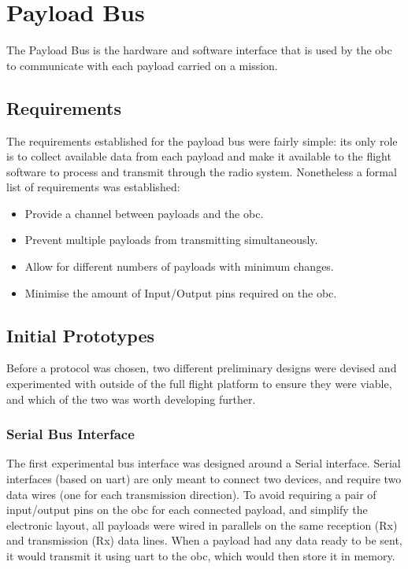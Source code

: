 \section{Payload Bus}
\label{sec:payload-bus}

The Payload Bus is the hardware and software interface that is used by the
\acrfull{obc} to communicate with each payload carried on a mission.

\subsection{Requirements}

The requirements established for the payload bus were fairly simple: its only
role is to collect available data from each payload and make it available to
the flight software to process and transmit through the radio system.
Nonetheless a formal list of requirements was established:

\begin{itemize}
\item Provide a channel between payloads and the \acrshort{obc}.
\item Prevent multiple payloads from transmitting simultaneously.
\item Allow for different numbers of payloads with minimum changes.
\item Minimise the amount of Input/Output pins required on the \acrshort{obc}.
\end{itemize}

\subsection{Initial Prototypes}

Before a protocol was chosen, two different preliminary designs were devised
and experimented with outside of the full flight platform to ensure they were
viable, and which of the two was worth developing further.

\subsubsection{Serial Bus Interface}

The first experimental bus interface was designed around a Serial interface.
Serial interfaces (based on \acrshort{uart}) are only meant to connect two
devices, and require two data wires (one for each transmission direction). To
avoid requiring a pair of input/output pins on the \acrlong{obc} for each
connected payload, and simplify the electronic layout, all payloads were wired
in parallels on the same reception (Rx) and transmission (Rx) data lines. When
a payload had any data ready to be sent, it would transmit it using
\acrshort{uart} to the \acrshort{obc}, which would then store it in memory.


